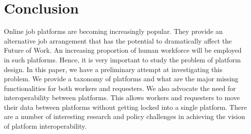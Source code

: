 \vspace{-.5cm}
\section{Conclusion}
\label{sec:conclusion}

Online job platforms are becoming increasingly popular.
They provide an alternative job arrangement that has the potential to dramatically affect the Future of Work. 
An increasing proportion of human workforce will be employed in such platforms.
Hence, it is very important to study the problem of platform design.
In this paper, we have a preliminary attempt at investigating this problem.
We provide a taxonomy of platforms and what are the major missing functionalities for both workers and requesters. 
We also advocate the need for interoperability between platforms.
This allows workers and requesters to move their data between platforms without getting locked into a single platform. 
There are a number of interesting research and policy challenges in achieving the vision of platform interoperability.

